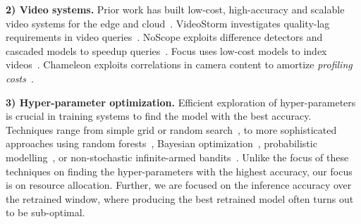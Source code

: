 \noindent\textbf{2) Video  systems.} Prior work has built low-cost, high-accuracy and scalable video  systems for the edge and cloud~\cite{videostorm,chameleon,noscope}. VideoStorm investigates quality-lag requirements in video queries~\cite{videostorm}. NoScope exploits difference detectors and cascaded models to speedup queries~\cite{noscope}. Focus uses low-cost models to index videos~\cite{DBLP:conf/osdi/HsiehABVBPGM18}. Chameleon exploits correlations in camera content to amortize {\em profiling costs}~\cite{chameleon}. 


\noindent\textbf{3) Hyper-parameter optimization.} %
Efficient exploration of hyper-parameters is crucial in training systems to find the model with the best accuracy. Techniques range from simple grid or random search~\cite{DBLP:journals/jmlr/BergstraB12}, to more sophisticated approaches using random forests~\cite{DBLP:conf/lion/HutterHL11}, Bayesian optimization~\cite{snoek2012practical, Swersky_scalablebayesian}, probabilistic modelling~\cite{DBLP:conf/middleware/RasleyH0RF17}, or non-stochastic infinite-armed bandits~\cite{hyperband}. Unlike the focus of these techniques on finding the hyper-parameters with the highest accuracy, our focus is on resource allocation. Further, we are focused on the inference accuracy over the retrained window, where producing the best retrained model often turns out to be sub-optimal.%

